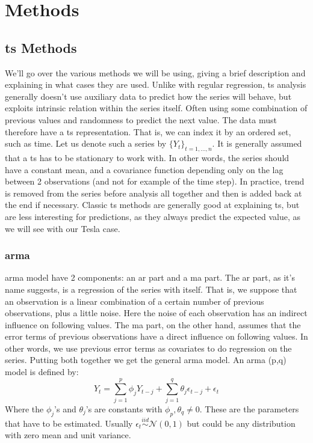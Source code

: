 \chapter{Methods}
\label{chap:methods}

\section{\acrlong{ts} Methods}
We'll go over the various methods we will be using, giving a brief description and explaining in what cases they are used.
Unlike with regular regression, \acrlong{ts} analysis generally doesn't use auxiliary data to predict how the series will behave, but exploits intrinsic relation within the series itself. Often using some combination of previous values and randomness to predict the next value.
The data must therefore have a \acrlong{ts} representation. That is, we can index it by an ordered set, such as time.
Let us denote such a series by $\{Y_t\}_{t=1,\dots,n}$.
It is generally assumed that a \acrlong{ts} has to be stationary to work with. In other words, the series should have a constant mean, and a covariance function depending only on the lag between 2 observations (and not for example of the time step). In practice, trend is removed from the series before analysis all together and then is added back at the end if necessary.
Classic \acrlong{ts} methods are generally good at explaining \acrshort{ts}, but are less interesting for predictions, as they always predict the expected value, as we will see with our Tesla case.


\subsection{\acrshort{arma}}
\acrfull{arma} model \cite{ARMAbook} have 2 components: an \acrfull{ar} part and a \acrfull{ma} part. 
The \acrshort{ar} part, as it's name suggests, is a regression of the series with itself. That is, we suppose that an observation is a linear combination of a certain number of previous observations, plus a little noise. Here the noise of each observation has an indirect influence on following values.
The \acrshort{ma} part, on the other hand, assumes that the error terms of previous observations have a direct influence on following values. In other words, we use previous error terms as covariates to do regression on the series.
Putting both together we get the general \acrshort{arma} model.
An \acrshort{arma} (p,q) model is defined by:
$$
Y_t = \sum_{j=1}^p \phi_j Y_{t-j} + \sum_{j=1}^q \theta_j \epsilon_{t-j} + \epsilon_t
$$
Where the $\phi_j$'s and $\theta_j$'s are constants with $\phi_p , \theta_q \neq 0$. These are the parameters that have to be estimated. Usually $\epsilon_t \stackrel{iid}{\sim} \mathcal{N}(0,1)$ but could be any distribution with zero mean and unit variance.

